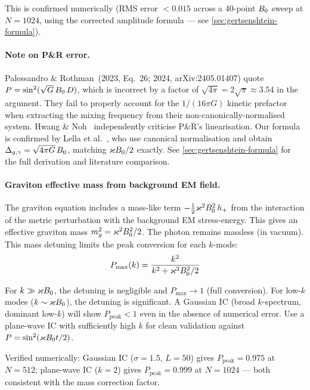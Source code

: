 This is confirmed numerically (RMS error $< 0.015$ across a 40-point $B_0$ sweep at $N = 1024$, using the corrected amplitude formula --- see \cref{sec:gertsenshtein-formula}).

\paragraph{Note on P\&R error.}
\label{par:pr-error}

Palessandro \& Rothman~(2023, Eq.~26; 2024, arXiv:2405.01407) quote $P = \sin^2(\sqrt{G}\,B_0\,D)$, which is incorrect by a factor of $\sqrt{4\pi} = 2\sqrt{\pi} \approx 3.54$ in the argument. They fail to properly account for the $1/(16\pi G)$ kinetic prefactor when extracting the mixing frequency from their non-canonically-normalised system. Hwang \& Noh~\cite{hwangnoh2023graviton} independently criticise P\&R's linearisation. Our formula is confirmed by Lella et al.~\cite{lella2024constraining}, who use canonical normalisation and obtain $\Delta_{g,\gamma} = \sqrt{4\pi G}\,B_0$, matching $\varkappa B_0/2$ exactly. See \cref{sec:gertsenshtein-formula} for the full derivation and literature comparison.

\paragraph{Graviton effective mass from background EM field.}
\label{par:graviton-mass}

The graviton equation includes a mass-like term $-\tfrac{1}{2}\varkappa^2B_0^2\, h_+$ from the interaction of the metric perturbation with the background EM stress-energy. This gives an effective graviton mass $m_g^2 = \varkappa^2B_0^2/2$. The photon remains massless (in vacuum). This mass detuning limits the peak conversion for each $k$-mode:
\begin{equation}
  P_\mathrm{max}(k) = \frac{k^2}{k^2 + \varkappa^2 B_0^2 / 2}
  \label{eq:gert-Pmax-k}
\end{equation}

For $k \gg \varkappa B_0$, the detuning is negligible and $P_\mathrm{max} \to 1$ (full conversion). For low-$k$ modes ($k \sim \varkappa B_0$), the detuning is significant. A Gaussian IC (broad $k$-spectrum, dominant low-$k$) will show $P_\mathrm{peak} < 1$ even in the absence of numerical error. Use a plane-wave IC with sufficiently high $k$ for clean validation against $P = \sin^2(\varkappa B_0 t/2)$.

Verified numerically: Gaussian IC ($\sigma = 1.5$, $L = 50$) gives $P_\mathrm{peak} = 0.975$ at $N = 512$; plane-wave IC ($k = 2$) gives $P_\mathrm{peak} = 0.999$ at $N = 1024$ --- both consistent with the mass correction factor.

